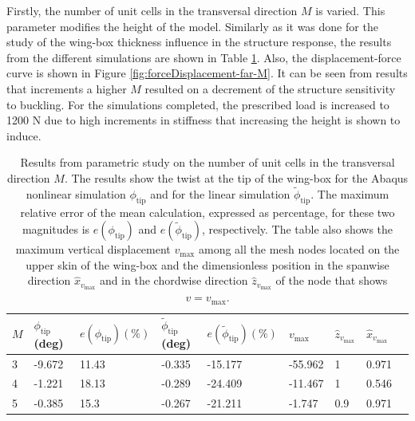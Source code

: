     Firstly, the number of unit cells in the transversal direction $M$ is varied. This parameter modifies the height of the model. Similarly as it was done for the study of the wing-box thickness \boxt influence in the structure response, the results from the different simulations are shown in Table \ref{tab:para_M}. Also, the displacement-force curve is shown in Figure \ref{fig:forceDisplacement-far-M}. It can be seen from results that increments a higher $M$ resulted on a decrement of the structure sensitivity to buckling. For the simulations completed, the prescribed load is increased to 1200 N due to high increments in stiffness that increasing the height is shown to induce.

    \begin{table}[!htpb] %
      \centering
      \begin{tabular}{|l|l|l|l|l|l|l|l|l|}
      \hline
      $M$ & $\phi_{\mathrm{tip}}$ (deg) & $e(\phi_{\mathrm{tip}}) (\%)$ & $\tilde{\phi}_{\mathrm{tip}}$ (deg) & $e(\tilde{\phi}_{\mathrm{tip}}) (\%)$ & $v_{\mathrm{max}}$ & $\hat{z}_{v_{\mathrm{max}}}$ & $\hat{x}_{v_{\mathrm{max}}}$ \\ \hline
      3 & -9.672 & 11.43 & -0.335 & -15.177 & -55.962 & 1   & 0.971 \\ \hline
      4 & -1.221 & 18.13 & -0.289 & -24.409 & -11.467 & 1   & 0.546 \\ \hline
      5 & -0.385 & 15.3  & -0.267 & -21.211 & -1.747  & 0.9 & 0.971 \\ \hline
      \end{tabular}
      \caption[Results from parametric study on the number of unit cells in the transversal direction]{Results from parametric study on the number of unit cells in the transversal direction $M$. The results show the twist at the tip of the wing-box for the Abaqus nonlinear simulation $\phi_{\mathrm{tip}}$ and for the linear simulation $\tilde{\phi}_{\mathrm{tip}}$. The maximum relative error of the mean calculation, expressed as percentage, for these two magnitudes is $e(\phi_{\mathrm{tip}})$ and $e(\tilde{\phi}_{\mathrm{tip}})$, respectively. The table also shows the maximum vertical displacement $v_{\mathrm{max}}$ among all the mesh nodes located on the upper skin of the wing-box and the dimensionless position in the spanwise direction $\hat{x}_{v_{\mathrm{max}}}$ and in the chordwise direction $\hat{z}_{v_{\mathrm{max}}}$ of the node that shows $v = v_{\mathrm{max}}$.}
      \label{tab:para_M}
    \end{table}

